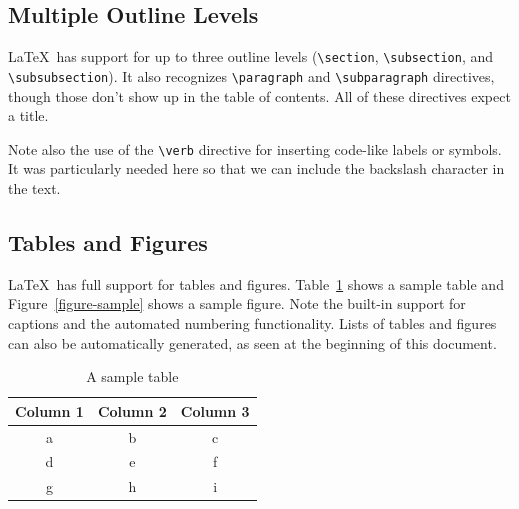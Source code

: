\documentclass{article}
\begin{document}
\subsection{Multiple Outline Levels}

\LaTeX\ has support for up to three outline levels (\verb!\section!, \verb!\subsection!, and \verb!\subsubsection!).  It also recognizes \verb!\paragraph! and \verb!\subparagraph! directives, though those don't show up in the table of contents.  All of these directives expect a title.

Note also the use of the \verb!\verb! directive for inserting code-like labels or symbols.  It was particularly needed here so that we can include the backslash character in the text.

\subsection{Tables and Figures}

\LaTeX\ has full support for tables and figures.  Table~\ref{table-sample} shows a sample table and Figure~\ref{figure-sample} shows a sample figure.  Note the built-in support for captions and the automated numbering functionality.  Lists of tables and figures can also be automatically generated, as seen at the beginning of this document.

\begin{table}
\centering
\begin{tabular}{|c|c|c|}\hline
Column 1 & Column 2 & Column 3 \\\hline\hline
a & b & c \\
d & e & f \\
g & h & i \\\hline
\end{tabular}

\caption{A sample table}
\label{table-sample}
\end{table}
\end{document}
